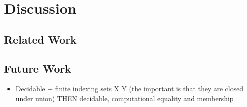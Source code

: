 \documentclass[sigplan,10pt,anonymous,review]{acmart}%
\begin{document}
\section{\NFO}


\section{Discussion}
\subsection{Related Work}
\subsection{Future Work}
\begin{itemize}
  \item Decidable + finite indexing sets X Y (the important is that they are closed under union) THEN decidable, computational equality and membership
\end{itemize}







\appendix
\end{document}
